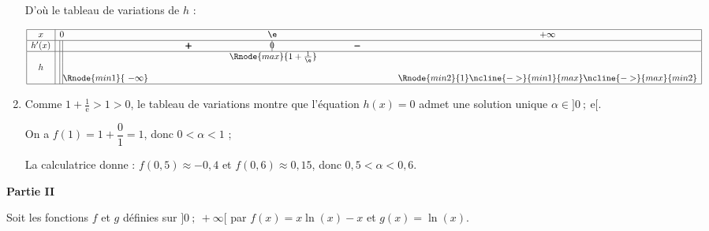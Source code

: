 \begin{enumerate}

D'où le tableau de variations de $h$ :

\begin{center}
{\renewcommand{\arraystretch}{1.3}
\def\esp{\hspace*{2.5cm}}%
\def\hauteur{0pt}%
$\begin{array}{|c|l*4{c}|}
\hline
x & 0  & \esp & \e\, & \esp & +\infty \\ 
\hline
h'(x) & \vline\;\vline &   \pmb{+} & \vline\hspace{-2.7pt}0 & \pmb{-} & \\ 
\hline
 &  \vline\;\vline & &   \Rnode{max}{1+\frac{1}{\e}}  &  &   \\  
h &\vline\;\vline &     &  &  &  \rule{0pt}{\hauteur} \\ 
 &\vline\;\vline \Rnode{min1}{~-\infty} &   &  &  &   \Rnode{min2}{1} \rule{0pt}{\hauteur}    
 \ncline{->}{min1}{max} 
 \ncline{->}{max}{min2} 
 \\ 
\hline
\end{array} $
}
\end{center}	

\item %
Comme $1 + \frac{1}{\text{e}} > 1 > 0$, le tableau de variations montre que l'équation $h(x) = 0$ admet une solution unique $\alpha \in ]0~;~\text{e}[$.

On a $f(1) = 1 + \dfrac{0}{1} = 1$, donc $0 < \alpha < 1$ ;

La calculatrice donne :
$f(0,5) \approx - 0,4$ et $f(0,6) \approx 0,15$, donc $0,5 < \alpha < 0,6$.
\end{enumerate}

\bigskip

\textbf{Partie II}

\medskip

Soit les fonctions $f$ et $g$ définies sur $]0~;~ +\infty[$ par
$f(x) = x \ln (x) - x$ et $g(x) = \ln (x).$

